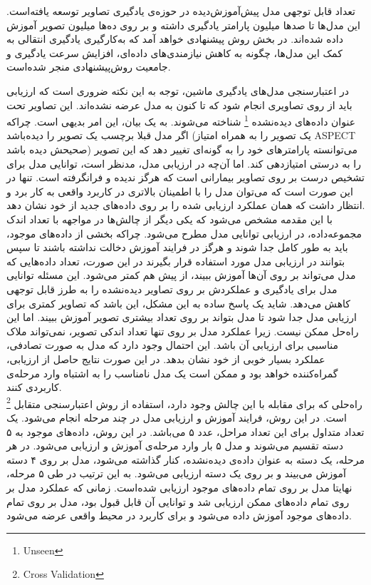 تعداد قابل توجهی مدل پیش‌آموزش‌دیده در حوزه‌ی یادگیری تصاویر توسعه یافته‌است.
این مدل‌ها  تا صد‌ها میلیون پارامتر یادگیری داشته و بر روی ده‌ها میلیون تصویر آموزش داده شده‌اند. 
در بخش روش پیشنهادی خواهد آمد که به‌کارگیری یادگیری انتقالی به کمک این مدل‌ها، چگونه به کاهش نیازمندی‌های داده‌ای، افزایش سرعت یادگیری و جامعیت روش‌پیشنهادی منجر شده‌است.


در اعتبار‌سنجی مدل‌های یادگیری ماشین، توجه به این نکته ضروری است که ارزیابی باید از روی تصاویری انجام شود که تا کنون به مدل عرضه نشده‌اند.
این تصاویر تحت عنوان داده‌های دیده‌نشده
\footnote{Unseen}
 شناخته می‌شوند.
به یک بیان، این امر بدیهی است.
چراکه اگر مدل قبلا برچسب یک تصویر را دیده‌باشد (یک تصویر را به همراه امتیاز ASPECT صحیحش دیده باشد) می‌توانسته پارامتر‌های خود را به گونه‌ای تغییر دهد که این تصویر را به درستی امتیازدهی کند.
اما آن‌چه در ارزیابی مدل، مدنظر است، توانایی مدل برای تشخیص درست بر روی تصاویر بیمارانی است که هرگز ندیده و فرانگرفته است.
تنها در این صورت است که می‌توان مدل را با اطمینان بالاتری در کاربرد واقعی به کار برد و انتظار داشت که همان عملکرد ارزیابی شده را بر روی داده‌های جدید از خود نشان دهد.\\

با این مقدمه مشخص می‌شود که
یکی دیگر از چالش‌ها در مواجهه با تعداد اندک مجموعه‌داده، در ارزیابی توانایی مدل مطرح می‌شود.
چراکه بخشی از داده‌های موجود، باید به طور کامل جدا شوند و هرگز در فرایند آموزش دخالت نداشته باشند تا سپس بتوانند در ارزیابی مدل مورد استفاده قرار بگیرند
در این صورت، تعداد داده‌هایی که مدل می‌تواند بر روی آن‌ها آموزش ببیند، از پیش هم کمتر می‌شود.
این مسئله توانایی مدل برای یادگیری و عملکردش بر روی تصاویر دیده‌نشده را به طرز قابل توجهی کاهش می‌دهد.
شاید یک پاسخ ساده به این مشکل، این باشد که تصاویر کمتری برای ارزیابی مدل جدا شود تا مدل بتواند بر روی تعداد بیشتری تصویر آموزش ببیند.
اما این راه‌حل ممکن نیست.
زیرا عملکرد مدل بر روی تنها تعداد اندکی تصویر، نمی‌تواند ملاک مناسبی برای ارزیابی آن باشد.
این احتمال وجود دارد که مدل به صورت تصادفی، عملکرد بسیار خوبی از خود نشان بدهد.
در این صورت نتایج حاصل از ارزیابی،‌ گمراه‌کننده خواهد بود و ممکن است یک مدل نامناسب را به اشتباه وارد مرحله‌ی کاربردی کنند.\\

راه‌حلی که برای مقابله با این چالش وجود دارد، استفاده از روش اعتبارسنجی متقابل
\footnote{Cross Validation}
است.
در این روش، فرایند آموزش و ارزیابی مدل در چند مرحله انجام می‌شود.
یک تعداد متداول برای این تعداد مراحل، عدد ۵ می‌باشد.
در این روش، داده‌های موجود به ۵ دسته تقسیم می‌شوند و مدل ۵ بار وارد مرحله‌ی آموزش و ارزیابی می‌شود.
در هر مرحله، یک دسته به عنوان داده‌ی دیده‌نشده، کنار گذاشته می‌شود، مدل بر روی ۴ دسته آموزش می‌بیند و بر روی یک دسته ارزیابی می‌شود. 
به این ترتیب در طی ۵ مرحله، نهایتا مدل بر روی تمام داده‌های موجود ارزیابی شده‌است.
زمانی که عملکرد مدل بر روی تمام داده‌های ممکن ارزیابی شد و توانایی آن قابل قبول بود، مدل بر روی تمام داده‌های موجود آموزش داده‌ می‌شود و برای کاربرد در محیط واقعی عرضه می‌شود.\\

